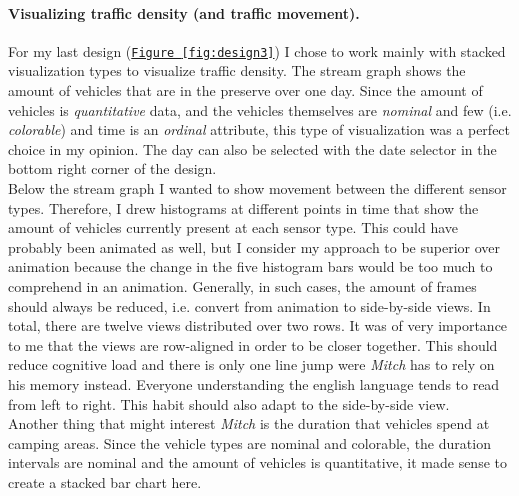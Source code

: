 \documentclass{article}
\begin{document}
\paragraph{Visualizing traffic density (and traffic movement).}
For my last design (\texttt{\hyperref[fig:design3]{Figure~\ref{fig:design3}}}) I chose to work mainly with stacked visualization types to visualize traffic density. The stream graph shows the amount of vehicles that are in the preserve over one day. Since the amount of vehicles is \textit{quantitative} data, and the vehicles themselves are \textit{nominal} and few (i.e. \textit{colorable}) and time is an \textit{ordinal} attribute, this type of visualization was a perfect choice in my opinion\citep{munzner2015visualization}. The day can also be selected with the date selector in the bottom right corner of the design.\\
Below the stream graph I wanted to show movement between the different sensor types. Therefore, I drew histograms at different points in time that show the amount of vehicles currently present at each sensor type. This could have probably been animated as well, but I consider my approach to be superior over animation because the change in the five histogram bars would be too much to comprehend in an animation. Generally, in such cases, the amount of frames should always be reduced, i.e. convert from animation to side-by-side views. In total, there are twelve views distributed over two rows. It was of very importance to me that the views are row-aligned in order to be closer together. This should reduce cognitive load and there is only one line jump were \textit{Mitch} has to rely on his memory instead\citep{munzner2015visualization}. Everyone understanding the english language tends to read from left to right. This habit should also adapt to the side-by-side view.\\
Another thing that might interest \textit{Mitch} is the duration that vehicles spend at camping areas. Since the vehicle types are nominal and colorable,  the duration intervals are nominal and the amount of vehicles is quantitative, it made sense to create a stacked bar chart here\citep{munzner2015visualization}.
\end{document}
